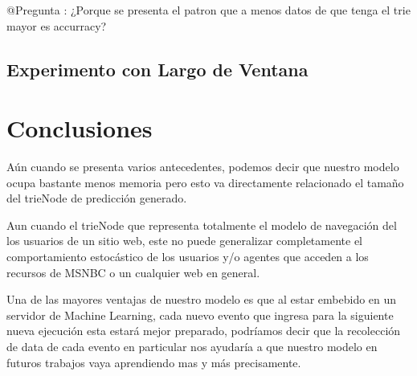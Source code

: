 @Pregunta : ¿Porque se presenta el patron que a menos datos de que tenga el trie mayor es accurracy?


















\subsection{Experimento con Largo de Ventana}













\vspace{2cm}
\section{Conclusiones}



Aún cuando se presenta varios antecedentes, podemos decir que nuestro modelo ocupa bastante menos memoria pero esto va directamente relacionado el tamaño del trieNode de predicción generado.

%
Aun cuando el trieNode que representa totalmente el modelo de navegación del los usuarios de un sitio web, este no puede generalizar completamente el comportamiento estocástico de los usuarios y/o agentes que acceden a los recursos de MSNBC o un cualquier web en general.

Una de las mayores ventajas de nuestro modelo es que al estar embebido en un servidor de Machine Learning, cada nuevo evento que ingresa para la siguiente nueva ejecución esta estará mejor preparado, podríamos decir que la recolección de data de cada evento en particular nos ayudaría a que nuestro modelo en futuros trabajos vaya aprendiendo mas y más precisamente.


